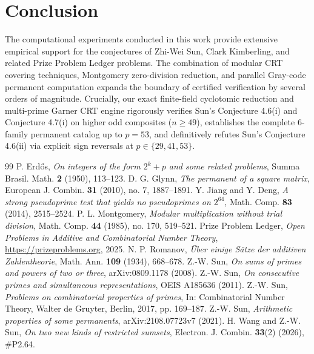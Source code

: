 \documentclass[11pt,a4paper]{article}
\theoremstyle{definition}
\theoremstyle{remark}
\begin{document}
\section{Conclusion}
The computational experiments conducted in this work provide extensive empirical support for the conjectures of Zhi-Wei Sun, Clark Kimberling, and related Prize Problem Ledger problems. The combination of modular CRT covering techniques, Montgomery zero-division reduction, and parallel Gray-code permanent computation expands the boundary of certified verification by several orders of magnitude. Crucially, our exact finite-field cyclotomic reduction and multi-prime Garner CRT engine rigorously verifies Sun's Conjecture 4.6(i) and Conjecture 4.7(i) on higher odd composites ($n \ge 49$), establishes the complete 6-family permanent catalog up to $p = 53$, and definitively refutes Sun's Conjecture 4.6(ii) via explicit sign reversals at $p \in \{29, 41, 53\}$.

\begin{thebibliography}{99}
 P. Erd\H{o}s, \textit{On integers of the form $2^k + p$ and some related problems}, Summa Brasil. Math. \textbf{2} (1950), 113--123.
 D. G. Glynn, \textit{The permanent of a square matrix}, European J. Combin. \textbf{31} (2010), no. 7, 1887--1891.
 Y. Jiang and Y. Deng, \textit{A strong pseudoprime test that yields no pseudoprimes on $2^{64}$}, Math. Comp. \textbf{83} (2014), 2515--2524.
 P. L. Montgomery, \textit{Modular multiplication without trial division}, Math. Comp. \textbf{44} (1985), no. 170, 519--521.
 Prize Problem Ledger, \textit{Open Problems in Additive and Combinatorial Number Theory}, \url{https://prizeproblems.org}, 2025.
 N. P. Romanov, \textit{\"Uber einige S\"atze der additiven Zahlentheorie}, Math. Ann. \textbf{109} (1934), 668--678.
 Z.-W. Sun, \textit{On sums of primes and powers of two or three}, arXiv:0809.1178 (2008).
 Z.-W. Sun, \textit{On consecutive primes and simultaneous representations}, OEIS A185636 (2011).
 Z.-W. Sun, \textit{Problems on combinatorial properties of primes}, In: Combinatorial Number Theory, Walter de Gruyter, Berlin, 2017, pp. 169--187.
 Z.-W. Sun, \textit{Arithmetic properties of some permanents}, arXiv:2108.07723v7 (2021).
 H. Wang and Z.-W. Sun, \textit{On two new kinds of restricted sumsets}, Electron. J. Combin. \textbf{33}(2) (2026), \#P2.64.
\end{thebibliography}
\end{document}
